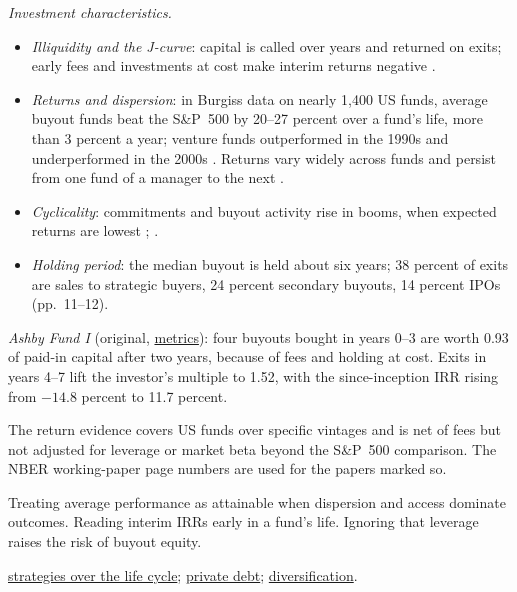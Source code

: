 \begin{qfdefinition}
\emph{Investment characteristics.}
\begin{itemize}
\item \emph{Illiquidity and the J-curve}: capital is called over years and returned on exits; early fees and investments at cost make interim returns negative \citep[pp.~16--18]{ippolito-private-capital-2020}.
\item \emph{Returns and dispersion}: in Burgiss data on nearly 1,400 US funds, average buyout funds beat the S\&P~500 by 20--27 percent over a fund's life, more than 3 percent a year; venture funds outperformed in the 1990s and underperformed in the 2000s \citep[abstract]{pe-harris-jenkinson-kaplan-2014}. Returns vary widely across funds and persist from one fund of a manager to the next \citep[NBER WP 9807, pp.~1--2]{pe-kaplan-schoar-2005}.
\item \emph{Cyclicality}: commitments and buyout activity rise in booms, when expected returns are lowest \citep[p.~596]{s7-ang}; \citep[p.~3]{pe-kaplan-stromberg-2009}.
\item \emph{Holding period}: the median buyout is held about six years; 38 percent of exits are sales to strategic buyers, 24 percent secondary buyouts, 14 percent IPOs (pp.~11--12).
\end{itemize}

 \emph{Ashby Fund I} (original, \hyperref[meth:private-fund-multiples-pme]{metrics}): four buyouts bought in years 0--3 are worth 0.93 of paid-in capital after two years, because of fees and holding at cost. Exits in years 4--7 lift the investor's multiple to 1.52, with the since-inception IRR rising from $-14.8$ percent to 11.7 percent.

 The return evidence covers US funds over specific vintages and is net of fees but not adjusted for leverage or market beta beyond the S\&P~500 comparison. The NBER working-paper page numbers are used for the papers marked so.

 Treating average performance as attainable when dispersion and access dominate outcomes. Reading interim IRRs early in a fund's life. Ignoring that leverage raises the risk of buyout equity.

 \hyperref[meth:private-equity-strategies]{strategies over the life cycle}; \hyperref[def:private-debt-features]{private debt}; \hyperref[meth:private-capital-diversification]{diversification}.

\end{qfdefinition}

